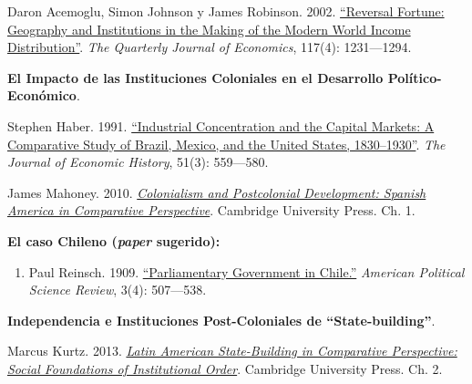 \documentclass[letterpaper]{article}
\renewenvironment{itemize}{
  \begin{list}{}{
    \setlength{\leftmargin}{1.5em}
  }
}{
  \end{list}
}
\begin{document}
\begin{enumerate}[label=\roman*.]
\begin{itemize}
\begin{itemize}
          \item[$\circ$] Daron Acemoglu, Simon Johnson y James Robinson. 2002. \href{https://github.com/hbahamonde/Ciencia_Politica_II/raw/master/Readings/Reversal_of_fortune.pdf}{``Reversal Fortune: Geography and Institutions in the Making of the Modern World Income Distribution''}. \emph{The Quarterly Journal of Economics}, 117(4): 1231---1294. 
				\end{itemize}


		\item[6.] {\bf El Impacto de las Instituciones Coloniales en el Desarrollo Pol\'itico-Econ\'omico}.
				\begin{itemize}
					\item[$\circ$] Stephen Haber. 1991. \href{https://github.com/hbahamonde/Ciencia_Politica_II/raw/master/Readings/Haber.pdf}{``Industrial Concentration and the Capital Markets: A Comparative Study of Brazil, Mexico, and the United States, 1830–1930''}. \emph{The Journal of Economic History}, 51(3): 559---580. 
					
          \item[$\circ$]  James Mahoney. 2010. \href{https://github.com/hbahamonde/Ciencia_Politica_II/raw/master/Readings/Mahoney_Colonialism_PostColonialsm.pdf}{\emph{Colonialism and Postcolonial Development: Spanish America in Comparative Perspective}}. Cambridge University Press. Ch. 1. 

					\item[{\Pointinghand}] {\bf El caso Chileno (\emph{paper} sugerido):}
									\begin{enumerate}
										\item Paul Reinsch. 1909. \href{https://github.com/hbahamonde/Ciencia_Politica_II/raw/master/Readings/reinsch1909.pdf}{``Parliamentary Government in Chile.''} \emph{American Political Science Review}, 3(4): 507---538.
									\end{enumerate}

				\end{itemize}

		\item[7.] {\bf Independencia e Instituciones Post-Coloniales de ``State-building''}.
				\begin{itemize}
					\item[$\circ$]  Marcus Kurtz. 2013. \href{https://github.com/hbahamonde/Ciencia_Politica_II/raw/master/Readings/Kurtz_2013.pdf}{\emph{Latin American State-Building in Comparative Perspective: Social Foundations of Institutional Order}}. Cambridge University Press. Ch. 2.
					

\end{itemize}
\end{itemize}
\end{enumerate}
\end{document}
